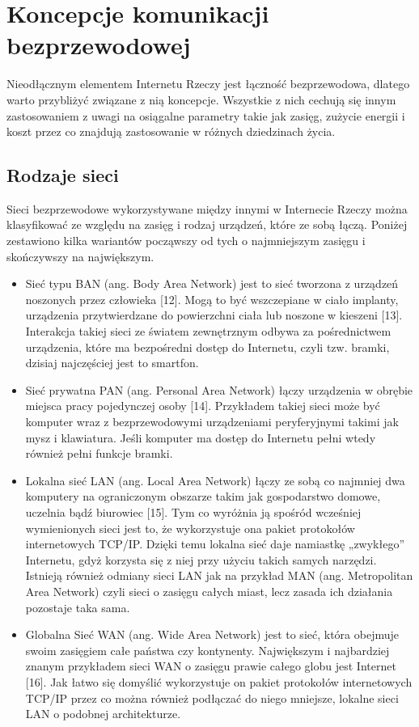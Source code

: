 \documentclass[12pt, twoside, openany]{mwrep}
\begin{document}
\section{Koncepcje komunikacji bezprzewodowej}

Nieodłącznym elementem Internetu Rzeczy jest łączność bezprzewodowa, dlatego warto przybliżyć związane z nią koncepcje. Wszystkie z nich cechują się innym zastosowaniem z uwagi na osiągalne parametry takie jak zasięg, zużycie energii i koszt przez co znajdują zastosowanie w różnych dziedzinach życia.

\subsection{Rodzaje sieci}

Sieci bezprzewodowe wykorzystywane między innymi w Internecie Rzeczy można klasyfikować ze względu na zasięg i rodzaj urządzeń, które ze sobą łączą. Poniżej zestawiono kilka wariantów począwszy od tych o najmniejszym zasięgu i skończywszy na największym.
\begin{itemize}
    \item Sieć typu BAN (ang. Body Area Network) jest to sieć tworzona z urządzeń noszonych przez człowieka [12]. Mogą to być wszczepiane w ciało implanty, urządzenia przytwierdzane do powierzchni ciała lub noszone w kieszeni [13]. Interakcja takiej sieci ze światem zewnętrznym odbywa za pośrednictwem urządzenia, które ma bezpośredni dostęp do Internetu, czyli tzw. bramki, dzisiaj najczęściej jest to smartfon.
    \item Sieć prywatna PAN (ang. Personal Area Network) łączy urządzenia w obrębie miejsca pracy pojedynczej osoby [14]. Przykładem takiej sieci może być komputer wraz z bezprzewodowymi urządzeniami peryferyjnymi takimi jak mysz i klawiatura. Jeśli komputer ma dostęp do Internetu pełni wtedy również pełni funkcje bramki.
    \item Lokalna sieć LAN (ang. Local Area Network) łączy ze sobą co najmniej dwa komputery na ograniczonym obszarze takim jak gospodarstwo domowe, uczelnia bądź biurowiec [15]. Tym co wyróżnia ją spośród wcześniej wymienionych sieci jest to, że wykorzystuje ona pakiet protokołów internetowych TCP/IP. Dzięki temu lokalna sieć daje namiastkę „zwykłego” Internetu, gdyż korzysta się z niej przy użyciu takich samych narzędzi. Istnieją również odmiany sieci LAN jak na przykład MAN (ang. Metropolitan Area Network) czyli sieci o zasięgu całych miast, lecz zasada ich działania pozostaje taka sama.
    \item Globalna Sieć WAN (ang. Wide Area Network) jest to sieć, która obejmuje swoim zasięgiem całe państwa czy kontynenty. Największym i najbardziej znanym przykładem sieci WAN o zasięgu prawie całego globu jest Internet [16]. Jak łatwo się domyślić wykorzystuje on pakiet protokołów internetowych TCP/IP przez co można również podłączać do niego mniejsze, lokalne sieci LAN o podobnej architekturze.
\end{itemize}   
\end{document}
